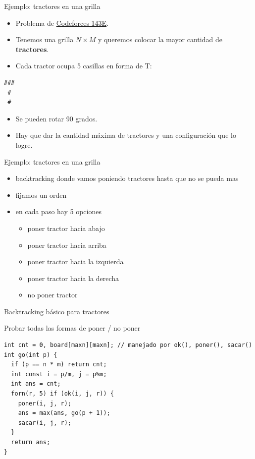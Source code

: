 \documentclass[aspectratio=169]{beamer}
\begin{document}
\begin{frame}[fragile]{Ejemplo: tractores en una grilla}
  \begin{itemize}
    \item Problema de \href{https://codeforces.com/contest/143/problem/E}{Codeforces 143E}.
    \item Tenemos una grilla \(N \times M\) y queremos colocar la mayor cantidad de \textbf{tractores}.
    \item Cada tractor ocupa 5 casillas en forma de T:
  \end{itemize}
  \vspace{0.2cm}
  \begin{center}
  \begin{verbatim}
###
 #
 #
  \end{verbatim}
  \end{center}
  \begin{itemize}
    \item Se pueden rotar 90 grados.
    \item Hay que dar la cantidad máxima de tractores y una configuración que lo logre.
  \end{itemize}
\end{frame}

\begin{frame}[fragile]{Ejemplo: tractores en una grilla}
  \begin{itemize}
    \item backtracking donde vamos poniendo tractores hasta que no se pueda mas
    \item fijamos un orden
    \item en cada paso hay 5 opciones
      \begin{itemize}
          \item poner tractor hacia abajo
          \item poner tractor hacia arriba
          \item poner tractor hacia la izquierda
          \item poner tractor hacia la derecha
          \item no poner tractor
      \end{itemize}
  \end{itemize}
\end{frame}



\begin{frame}[fragile]{Backtracking básico para tractores}
  \begin{block}{Probar todas las formas de poner / no poner}
  \begin{lstlisting}[style=customc]
int cnt = 0, board[maxn][maxn]; // manejado por ok(), poner(), sacar()
int go(int p) {
  if (p == n * m) return cnt;
  int const i = p/m, j = p%m;
  int ans = cnt;
  forn(r, 5) if (ok(i, j, r)) {
    poner(i, j, r);
    ans = max(ans, go(p + 1));
    sacar(i, j, r);
  }
  return ans;
}\end{lstlisting}
  \end{block}
\end{frame}
\end{document}
